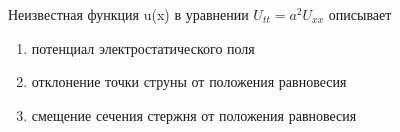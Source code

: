 Неизвестная функция u(x) в уравнении \(U_{tt}=a^2U_{xx}\) описывает

\begin{enumerate}[label=\arabic*)]
    \item потенциал электростатического поля
    \item отклонение точки струны от положения равновесия
    \item смещение сечения стержня от положения равновесия
\end{enumerate}

